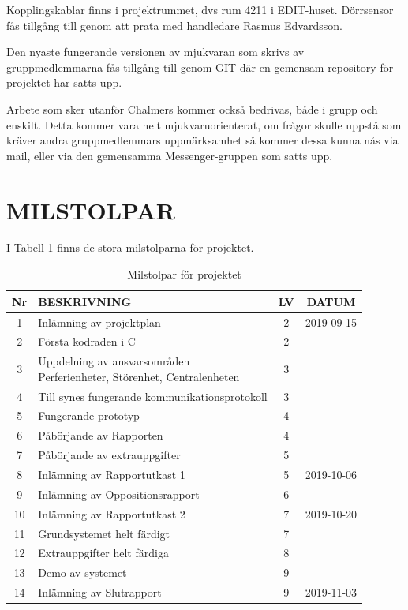 \documentclass[a4paper]{article}
\begin{document}
Kopplingskablar finns i projektrummet, dvs rum 4211 i EDIT-huset. Dörrsensor fås tillgång till genom att prata med handledare Rasmus Edvardsson.

Den nyaste fungerande versionen av mjukvaran som skrivs av gruppmedlemmarna fås tillgång till genom GIT där en gemensam repository för projektet har satts upp.

Arbete som sker utanför Chalmers kommer också bedrivas, både i grupp och enskilt. Detta kommer vara helt mjukvaruorienterat, om frågor skulle uppstå som kräver andra gruppmedlemmars uppmärksamhet så kommer dessa kunna nås via mail, eller via den gemensamma Messenger-gruppen som satts upp.

\section{MILSTOLPAR}
\label{sec:milstolpar}

I Tabell \ref{tab:milstolpar} finns de stora milstolparna för projektet.

	\begin{table}[htbp]
	\begin{tabular}{|c|l|c|c|}
		\hline
		Nr & BESKRIVNING & LV & DATUM \\ \hline \hline

		1 & Inlämning av projektplan & 2 & 2019-09-15 \\ \hline
		2 & Första kodraden i C & 2 & \\ \hline
		3 & \pbox{20cm}{Uppdelning av ansvarsområden \\ Perferienheter, Störenhet, Centralenheten} & 3 & \\ \hline
		4 & Till synes fungerande kommunikationsprotokoll & 3 & \\ \hline
		5 & Fungerande prototyp & 4 & \\ \hline
		6 & Påbörjande av Rapporten & 4 & \\ \hline
		7 & Påbörjande av extrauppgifter & 5 & \\ \hline
		8 & Inlämning av Rapportutkast 1 & 5 & 2019-10-06 \\ \hline
		9 & Inlämning av Oppositionsrapport &6 & \\ \hline
		10 & Inlämning av Rapportutkast 2 & 7 & 2019-10-20 \\ \hline
		11 & Grundsystemet helt färdigt & 7 & \\ \hline
		12 & Extrauppgifter helt färdiga & 8 & \\ \hline
		13 & Demo av systemet & 9 & \\ \hline
		14 & Inlämning av Slutrapport & 9 & 2019-11-03 \\ \hline
	\end{tabular}
	\caption{Milstolpar för projektet}
	\label{tab:milstolpar}
\end{table}
\end{document}
